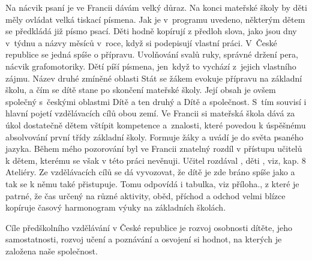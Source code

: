 Na nácvik psaní je ve Francii dávám velký důraz. Na konci mateřské školy by děti měly ovládat velká tiskací písmena. Jak je v programu uvedeno, některým dětem se předkládá již písmo psací. Děti hodně kopírují z předloh slova, jako jsou dny v týdnu a názvy měsíců v roce, když si podepisují vlastní práci. V České republice se jedná spíše o přípravu. Uvolňování svalů ruky, správné držení pera, nácvik grafomotoriky. Dětí píší písmena, jen když to vychází z jejich vlastního zájmu. 
Název druhé zmíněné oblasti Stát se žákem evokuje přípravu na základní školu, a čím se dítě stane po skončení mateřské školy. Její obsah je ovšem společný s českými oblastmi Dítě a ten druhý a Dítě a společnost. S tím souvisí i hlavní pojetí vzdělávacích cílů obou zemí. Ve Francii si mateřská škola dává za úkol dostatečně dětem vštípit kompetence a znalosti, které povedou k úspěšnému absolvování první třídy základní školy. Formuje žáky a uvádí je do světa psaného jazyka. Během mého pozorování byl ve Francii znatelný rozdíl v přístupu učitelů k dětem, kterému se však v této práci nevěnuji. Učitel rozdával , děti , viz, kap. 8 Ateliéry. Ze vzdělávacích cílů se dá vyvozovat, že dítě je zde bráno spíše jako  a tak se k němu také přistupuje. Tomu odpovídá i tabulka, viz příloha., z které je patrné, že čas určený na různé aktivity, oběd, příchod a odchod velmi blízce kopíruje časový harmonogram výuky na základních školách. 

Cíle předškolního vzdělávání v České republice je rozvoj osobnosti dítěte, jeho samostatnosti, rozvoj učení a poznávání a osvojení si hodnot, na kterých je založena naše společnost. 
